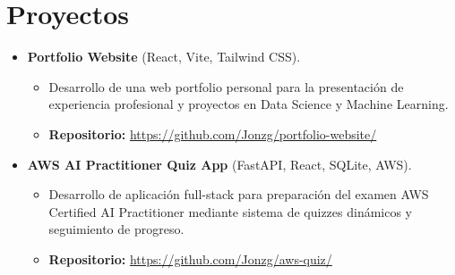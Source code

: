 \section{Proyectos}

\vspace{1em}

\begin{itemize}

    \item \textbf{Portfolio Website} (React, Vite, Tailwind CSS).
    \begin{itemize}
        \item Desarrollo de una web portfolio personal para la presentación de experiencia profesional y proyectos en Data Science y Machine Learning.
        \item \textbf{Repositorio:} \url{https://github.com/Jonzg/portfolio-website/}
    \end{itemize}

    \item \textbf{AWS AI Practitioner Quiz App} (FastAPI, React, SQLite, AWS).
    \begin{itemize}
        \item Desarrollo de aplicación full-stack para preparación del examen AWS Certified AI Practitioner mediante sistema de quizzes dinámicos y seguimiento de progreso.
        \item \textbf{Repositorio:} \url{https://github.com/Jonzg/aws-quiz/}
    \end{itemize}

\end{itemize}